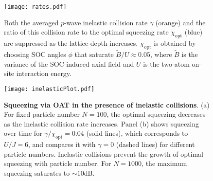 \documentclass{nature}
\begin{document}
\begin{spacing}{1}
\begin{figure}[t]
\centering
\texttt{[image: rates.pdf]}
\caption{
Both the averaged $p$-wave inelastic collision rate $\gamma$ (orange) and the ratio of this collision rate to the optimal squeezing rate $\chi_{\text{opt}}$ (blue) are suppressed as the lattice depth increases.
$\chi_{\text{opt}}$ is obtained by choosing SOC angles $\phi$ that saturate $\widetilde{B}/U\approx0.05$, where $\widetilde{B}$ is the variance of the SOC-induced axial field and $U$ is the two-atom on-site interaction energy.
}
\label{fig:inelastic_rates}
\end{figure}
\end{spacing}

\begin{spacing}{1}
\begin{figure}[t]
\centering
\texttt{[image: inelasticPlot.pdf]}
\caption{\textbf{Squeezing via OAT in the presence of inelastic collisions}.
(a) For fixed particle number $N=100$, the optimal squeezing decreases as the inelastic collision rate increases.
Panel (b) shows squeezing over time for $\gamma/\chi_{\text{opt}}=0.04$ (solid lines), which corresponds to $U/J=6$,
and compares it with $\gamma=0$ (dashed lines) for  different particle numbers.
Inelastic collisions prevent the growth of optimal  squeezing with  particle number. For $N=1000$, the maximum squeezing saturates to $\sim 10$dB.
}
\label{fig:inelastic_squeezing}
\end{figure}
\end{spacing}
\end{document}
